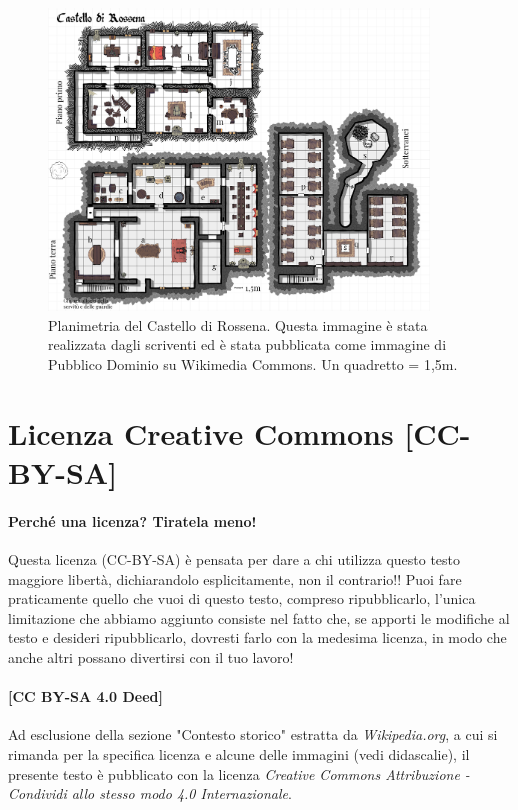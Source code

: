 \documentclass[letterpaper,twocolumn,openany,nodeprecatedcode]{dndbook}
\begin{document}
\begin{figure}
\centering
\includegraphics[width=0.9\textwidth]{img/rossena.png}
\caption{Planimetria del Castello di Rossena. Questa immagine è stata realizzata dagli scriventi ed è stata pubblicata come immagine di Pubblico Dominio su Wikimedia Commons. Un quadretto = 1,5m.}
\label{rossena1}
\end{figure}



\chapter{Licenza Creative Commons [CC-BY-SA]}
\subsubsection{Perché una licenza? Tiratela meno!}

Questa licenza (CC-BY-SA) è pensata per dare a chi utilizza questo testo maggiore libertà, dichiarandolo esplicitamente, non il contrario!! Puoi fare praticamente quello che vuoi di questo testo, compreso ripubblicarlo, l'unica limitazione che abbiamo aggiunto consiste nel fatto che, se apporti le modifiche al testo e desideri ripubblicarlo, dovresti farlo con la medesima licenza, in modo che anche altri possano divertirsi con il tuo lavoro!

\subsubsection{[CC BY-SA 4.0 Deed]}
Ad esclusione della sezione "Contesto storico" estratta da \textit{Wikipedia.org}, a cui si rimanda per la specifica licenza e alcune delle immagini (vedi didascalie), il presente testo è pubblicato con la licenza \textit{Creative Commons Attribuzione - Condividi allo stesso modo 4.0 Internazionale}.
\end{document}
